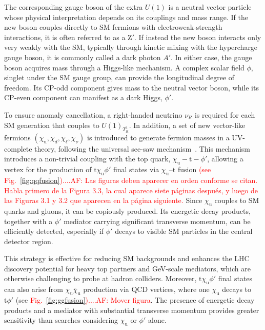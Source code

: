 The corresponding gauge boson of the extra $U(1)$ is a neutral vector particle whose physical interpretation depends on its couplings and mass range.  If the new boson couples directly to SM fermions with electroweak-strength interactions, it is often referred to as a $\textrm{Z}'$.  If instead the new boson interacts only very weakly with the SM, typically through kinetic mixing with the hypercharge gauge boson, it is commonly called a dark photon $A'$.  In either case, the gauge boson acquires mass through a Higgs-like mechanism. A complex scalar field $\phi$, singlet under the SM gauge group, can provide the longitudinal degree of freedom. Its CP-odd component gives mass to the neutral vector boson, while its CP-even component can manifest as a dark Higgs, $\phi'$.

To ensure anomaly cancellation, a right-handed neutrino $\nu_R$ is required for each SM generation that couples to $U(1)_{T^3_R}$. In addition, a set of new vector-like fermions $(\chi_\mathrm{u}, \chi_d, \chi_\ell, \chi_\nu)$ is introduced to generate fermion masses in a UV-complete theory, following the universal see-saw mechanism~\parencite{Berezhiani, Chang1987, Davidson1987, Rajpoot1987, Babu1989, Babu1990}. This mechanism introduces a non-trivial coupling with the top quark, $\chi_\mathrm{u} - \mathrm{t} -\phi'$, allowing a vertex for the production of $\mathrm{t}\chi_\mathrm{u} \phi'$ final states via $\chi_\mathrm{u}$--$\mathrm{t}$ fusion \textcolor{red}{(see Fig.~\ref{fig:qqfusion})....AF: Las figuras deben aparecer en orden conforme se citan. Habla primero de la Figura 3.3, la cual aparece siete páginas después, y luego de las Figuras 3.1 y 3.2 que aparecen en la página siguiente. } Since $\chi_\mathrm{u}$ couples to SM quarks and gluons, it can be copiously produced. Its energetic decay products, together with a $\phi'$ mediator carrying significant transverse momentum, can be efficiently detected, especially if $\phi'$ decays to visible SM particles in the central detector region.

This strategy is effective for reducing SM backgrounds and enhances the LHC discovery potential for heavy top partners and GeV-scale mediators, which are otherwise challenging to probe at hadron colliders. Moreover, $\mathrm{t}\chi_\mathrm{u} \phi'$ final states can also arise from $\chi_\mathrm{u}\bar\chi_\mathrm{u}$ production via QCD vertices, where one $\chi_\mathrm{u}$ decays to $\mathrm{t}\phi'$ (see \textcolor{red}{Fig.~\ref{fig:ggfusion})....AF: Mover figura}. The presence of energetic decay products and a mediator with substantial transverse momentum provides greater sensitivity than searches considering $\chi_\mathrm{u}$ or $\phi'$ alone.

